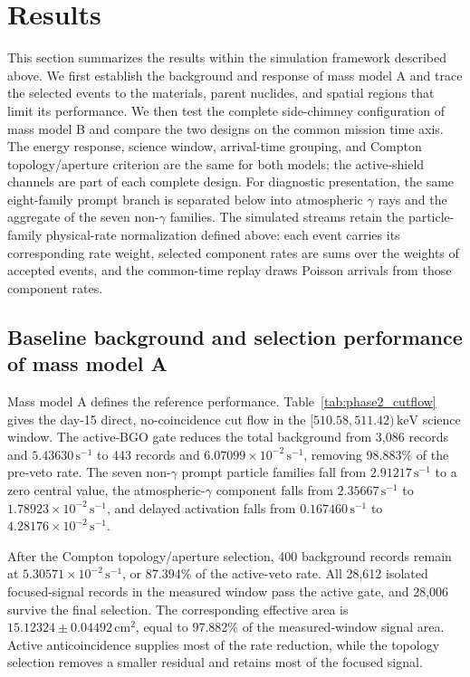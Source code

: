 \documentclass[11pt]{article}
\newcommand{\revblue}[1]{\textcolor{revisionblue}{#1}}
\newcommand{\keV}{\ensuremath{\,\mathrm{keV}}}
\newcommand{\cps}{\ensuremath{\,\mathrm{s^{-1}}}}
\begin{document}
\section{Results}
\label{sec:results}

This section summarizes the results within the simulation framework described above. We first establish the background and response of mass model A and trace the selected events to the materials, parent nuclides, and spatial regions that limit its performance. We then test the complete side-chimney configuration of mass model B and compare the two designs on the common mission time axis. The energy response, science window, arrival-time grouping, and Compton topology/aperture criterion are the same for both models; the active-shield channels are part of each complete design. \revblue{For diagnostic presentation, the same eight-family prompt branch is separated below into atmospheric $\gamma$ rays and the aggregate of the seven non-$\gamma$ families. The simulated streams retain the particle-family physical-rate normalization defined above: each event carries its corresponding rate weight, selected component rates are sums over the weights of accepted events, and the common-time replay draws Poisson arrivals from those component rates.}

\subsection{Baseline background and selection performance of mass model A}
\label{subsec:model_a_baseline}
\label{subsec:reference_background_results}

Mass model A defines the reference performance. Table~\ref{tab:phase2_cutflow} gives the day-15 direct, no-coincidence cut flow in the $[510.58,511.42)\keV$ science window. The active-BGO gate reduces the total background from 3,086 records and $5.43630\cps$ to 443 records and $6.07099\times10^{-2}\cps$, removing 98.883\% of the pre-veto rate. The \revblue{seven non-$\gamma$ prompt particle families} fall from $2.91217\cps$ to a zero central value, the \revblue{atmospheric-$\gamma$ component} falls from $2.35667\cps$ to $1.78923\times10^{-2}\cps$, and delayed activation falls from $0.167460\cps$ to $4.28176\times10^{-2}\cps$.

After the Compton topology/aperture selection, 400 background records remain at $5.30571\times10^{-2}\cps$, or 87.394\% of the active-veto rate. All 28,612 isolated focused-signal records in the measured window pass the active gate, and 28,006 survive the final selection. The corresponding effective area is $15.12324\pm0.04492\,\mathrm{cm^2}$, equal to 97.882\% of the measured-window signal area. Active anticoincidence supplies most of the rate reduction, while the topology selection removes a smaller residual and retains most of the focused signal.
\end{document}
